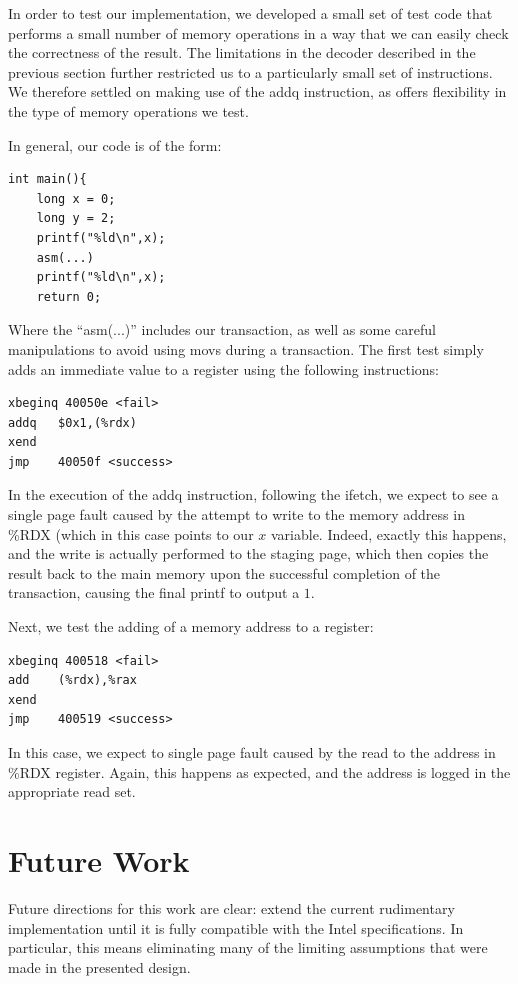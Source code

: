 \documentclass{acm_proc_article-sp}
\begin{document}
In order to test our implementation, we developed a small set of test code that
performs a small number of memory operations in a way that we can easily check
the correctness of the result. The limitations in the decoder described in the
previous section further restricted us to a particularly small set of 
instructions. We therefore settled on making use of the addq instruction, as
offers flexibility in the type of memory operations we test.

In general, our code is of the form:
\begin{verbatim}
int main(){
    long x = 0;
    long y = 2;
    printf("%ld\n",x);  
    asm(...)
    printf("%ld\n",x);  
    return 0;
\end{verbatim} 

Where the ``asm(...)'' includes our transaction, as well as some careful 
manipulations to avoid using movs during a transaction. The first test simply
adds an immediate value to a register using the following instructions:
\begin{verbatim}
xbeginq 40050e <fail>
addq   $0x1,(%rdx)
xend   
jmp    40050f <success>
\end{verbatim}

In the execution of the addq instruction, following the ifetch, we expect
to see a single page fault caused by the attempt to write to the memory address
in \%RDX (which in this case points to our $x$ variable. Indeed, exactly this 
happens, and the write is actually performed to the staging page, which then 
copies the result back to the main memory upon the successful completion of 
the transaction, causing the final printf to output a $1$.

Next, we test the adding of a memory address to a register:
\begin{verbatim}
xbeginq 400518 <fail>
add    (%rdx),%rax
xend   
jmp    400519 <success>
\end{verbatim}

In this case, we expect to single page fault caused by the read to the address
in \%RDX register. Again, this happens as expected, and the address is logged
in the appropriate read set.



\section{Future Work}

Future directions for this work are clear: extend the current rudimentary 
implementation until it is fully compatible with the Intel specifications. In
particular, this means eliminating many of the limiting assumptions that were
made in the presented design.
\end{document}
